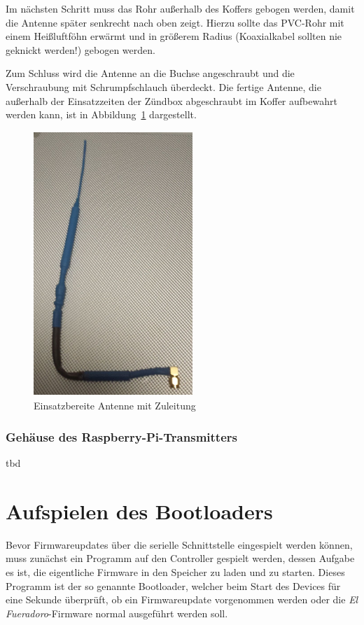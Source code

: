 \documentclass[paper=a4, parskip, numbers=noenddot, toc=listof, headsepline]{scrbook}
\newcommand{\anlage}{\emph{El Fueradoro}}
\begin{document}
					Im nächsten Schritt muss das Rohr außerhalb des Koffers gebogen werden, damit die Antenne später senkrecht nach oben zeigt. Hierzu sollte das PVC-Rohr mit einem Heißluftföhn erwärmt und in größerem Radius (Koaxialkabel sollten nie geknickt werden!) gebogen werden.

					Zum Schluss wird die Antenne an die Buchse angeschraubt und die Verschraubung mit Schrumpfschlauch überdeckt. Die fertige Antenne, die außerhalb der Einsatzzeiten der Zündbox abgeschraubt im Koffer aufbewahrt werden kann, ist in Abbildung~\ref{fig:antennefertig} dargestellt.

					\begin{figure}
						\centering
						\includegraphics[width=6cm, height=10cm]{Bilder/antennefertig}
						\caption{Einsatzbereite Antenne mit Zuleitung}
						\label{fig:antennefertig}
					\end{figure}

			\subsection{Gehäuse des Raspberry-Pi-Transmitters}

				tbd

	\chapter{Aufspielen des Bootloaders}
		\label{ch:bootloader}

		Bevor Firmwareupdates über die serielle Schnittstelle eingespielt werden können, muss zunächst ein Programm auf den Controller gespielt werden, dessen Aufgabe es ist, die eigentliche Firmware in den Speicher zu laden und zu starten. Dieses Programm ist der so genannte Bootloader, welcher beim Start des Devices für eine Sekunde überprüft, ob ein Firmwareupdate vorgenommen werden oder die {\anlage}-Firmware normal ausgeführt werden soll.
\end{document}
